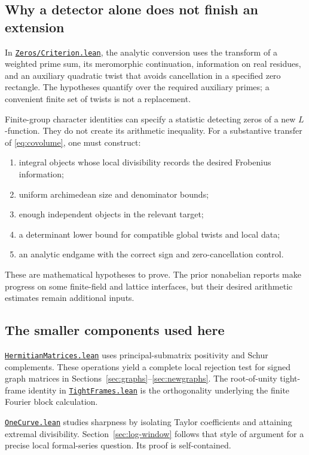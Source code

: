 \documentclass[11pt,letterpaper]{article}
\theoremstyle{definition}\newtheorem{definition}[theorem]{Definition}
\newcommand{\src}[2]{\href{https://github.com/lsernau/grh-lean/blob/72fead102f663d5c7a407964a13dc0cf9d977207/grh/src/#1}{#2}}
\begin{document}
\subsection{Why a detector alone does not finish an extension}

In \src{New/Reduction/Zeros/Criterion.lean}{\texttt{Zeros/Criterion.lean}},
the analytic conversion uses the transform of a weighted prime sum, its
meromorphic continuation, information on real residues, and an auxiliary
quadratic twist that avoids cancellation in a specified zero rectangle.
The hypotheses quantify over the required auxiliary primes; a convenient
finite set of twists is not a replacement.

Finite-group character identities can specify a statistic detecting zeros
of a new \(L\)-function. They do not create its arithmetic inequality.
For a substantive transfer of \eqref{eq:covolume}, one must construct:

\begin{enumerate}
\item integral objects whose local divisibility records the desired
Frobenius information;
\item uniform archimedean size and denominator bounds;
\item enough independent objects in the relevant target;
\item a determinant lower bound for compatible global twists and local data;
\item an analytic endgame with the correct sign and zero-cancellation control.
\end{enumerate}

These are mathematical hypotheses to prove. The prior nonabelian reports
make progress on some finite-field and lattice interfaces, but their desired
arithmetic estimates remain additional inputs.

\subsection{The smaller components used here}

\src{Lib/General/LinearAlgebra/HermitianMatrices.lean}
{\texttt{HermitianMatrices.lean}} uses principal-submatrix positivity and
Schur complements. These operations yield a complete local rejection test
for signed graph matrices in Sections~\ref{sec:graphs}--\ref{sec:newgraphs}.
The root-of-unity tight-frame identity in
\src{New/Derivatives/Vacuum/TightFrames.lean}{\texttt{TightFrames.lean}}
is the orthogonality underlying the finite Fourier block calculation.

\src{New/Derivatives/Sharpness/OneCurve.lean}{\texttt{OneCurve.lean}}
studies sharpness by isolating Taylor coefficients and attaining extremal
divisibility. Section~\ref{sec:log-window} follows that style of argument for
a precise local formal-series question. Its proof is self-contained.







\clearpage

\end{document}
